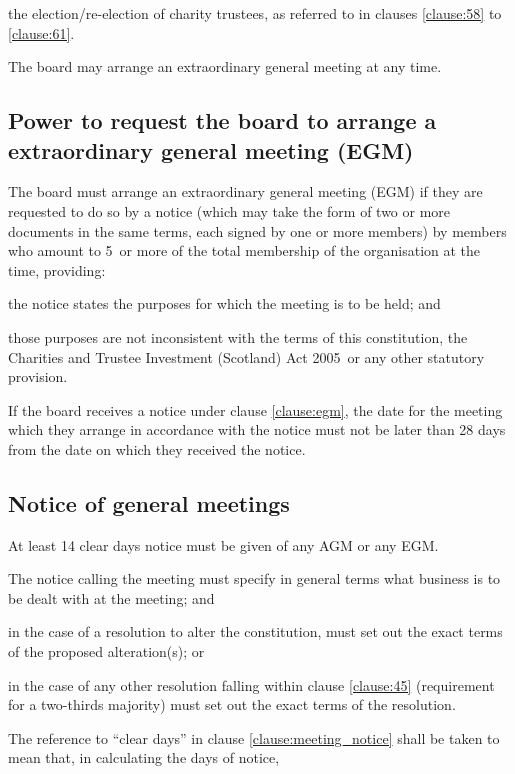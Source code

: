 \documentclass{article}
\newcommand{\charityact}{Charities and Trustee Investment (Scotland) Act 2005}
\begin{document}
\subclause the election/re-election of charity trustees, as referred
to in clauses \ref{clause:58} to \ref{clause:61}.

\clause The board may arrange an extraordinary general meeting at any time.

\subsection{Power to request the board to arrange a extraordinary
  general meeting (EGM)}

\clause\label{clause:egm}The board must arrange an extraordinary
general meeting (EGM) if they are requested to do so by a notice
(which may take the form of two or more documents in the same terms,
each signed by one or more members) by members who amount to
5\percent\ or more of the total membership of the organisation at the
time, providing:

\subclause the notice states the purposes for which the meeting is to
be held; and

\subclause those purposes are not inconsistent with the terms of this
constitution, the \charityact\ or any
other statutory provision.

\clause If the board receives a notice under clause \ref{clause:egm},
the date for the meeting which they arrange in accordance with the
notice must not be later than 28 days from the date on which they
received the notice.

\subsection{Notice of general meetings}

\clause\label{clause:meeting_notice}At least 14 clear days notice must
be given of any AGM or any EGM.

\clause The notice calling the meeting must specify in general terms
what business is to be dealt with at the meeting; and 

\subclause in the case of a resolution to alter the constitution, must
set out the exact terms of the proposed alteration(s); or

\subclause in the case of any other resolution falling within clause
\ref{clause:45} (requirement for a two-thirds majority) must set out
the exact terms of the resolution.

\clause The reference to ``clear days'' in clause
\ref{clause:meeting_notice} shall be taken to mean that, in
calculating the days of notice, 
\end{document}
